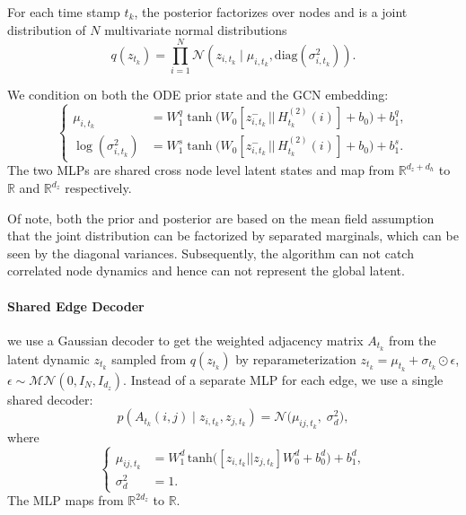 For each time stamp $t_k$, the posterior factorizes over nodes and is a joint distribution of $N$ multivariate normal distributions 
\begin{equation*}
    q(z_{t_k})=\prod_{i=1}^N \mathcal{N}(z_{i,t_k} \mid \mu_{i,t_k}, \mathrm{diag}(\sigma_{i,t_k}^2)).
\end{equation*}

We condition on both the ODE prior state and the GCN embedding:
\begin{equation*}
    \left\{\begin{aligned}
        \mu_{i,t_k} &= W_1^q \tanh\!\big( W_0 [z_{i,t_k}^- \,||\, H^{(2)}_{t_k}(i)] + b_0 \big) + b_1^q,\\
        \log(\sigma^2_{i,t_k}) &= W_1^s \tanh\!\big( W_0 [z_{i,t_k}^- \,||\, H^{(2)}_{t_k}(i)] + b_0 \big) + b_1^s.
    \end{aligned}\right.
\end{equation*}
The two MLPs are shared cross node level latent states and map from $\mathbb{R}^{d_z+d_h}$ to $\mathbb{R}$ and $\mathbb{R}^{d_z}$ respectively. 

Of note, both the prior and posterior are based on the mean field assumption that the joint distribution can be factorized by separated marginals, 
which can be seen by the diagonal variances. 
Subsequently, the algorithm can not catch correlated node dynamics and hence can not represent the global latent. 

\paragraph{Shared Edge Decoder}

we use a Gaussian decoder to get the weighted adjacency matrix $A_{t_k}$ from the latent dynamic $z_{t_k}$ sampled from $q(z_{t_k})$ by reparameterization $z_{t_k}=\mu_{t_k}+\sigma_{t_k}\odot \epsilon$, 
$\epsilon\sim\mathcal{MN}(0,I_N,I_{d_z})$. 
Instead of a separate MLP for each edge, we use a single shared decoder:
\begin{equation*}
    p(A_{t_k}(i,j)\mid z_{i,t_k}, z_{j,t_k})=\mathcal{N}\!\Big(\mu_{ij,t_k},\; \sigma_d^2\Big),
\end{equation*}
where
\begin{equation*}
    \left\{\begin{aligned}
        \mu_{ij,t_k} &= W_1^d\, \mathrm{tanh}\!\big([z_{i,t_k}|| z_{j,t_k}]W_0^d + b_0^d\big)+b_1^d, \\
        \sigma^2_d &= 1.
    \end{aligned}\right.
\end{equation*}
The MLP maps from $\mathbb{R}^{2d_z}$ to $\mathbb{R}$. 

